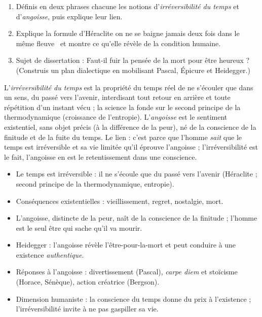 \documentclass[11pt]{article}
\newcommand{\cle}[1]{{\popxbold\color{popdark}#1}}
\begin{document}
\begin{exercice}
\begin{enumerate}
\item Définis en deux phrases chacune les notions d'\emph{irréversibilité du temps} et d'\emph{angoisse}, puis explique leur lien.
\item Explique la formule d'Héraclite \guillemotleft on ne se baigne jamais deux fois dans le même fleuve \guillemotright\ et montre ce qu'elle révèle de la condition humaine.
\item Sujet de dissertation : Faut-il fuir la pensée de la mort pour être heureux ? (Construis un plan dialectique en mobilisant Pascal, Épicure et Heidegger.)
\end{enumerate}
\end{exercice}

\begin{corrige}[Exercice 1]
L'\emph{irréversibilité du temps} est la propriété du temps réel de ne s'écouler que dans un sens, du passé vers l'avenir, interdisant tout retour en arrière et toute répétition d'un instant vécu ; la science la fonde sur le second principe de la thermodynamique (croissance de l'entropie). L'\emph{angoisse} est le sentiment existentiel, sans objet précis (à la différence de la peur), né de la conscience de la finitude et de la fuite du temps. Le lien : c'est parce que l'homme \emph{sait} que le temps est irréversible et sa vie limitée qu'il éprouve l'angoisse ; l'irréversibilité est le fait, l'angoisse en est le retentissement dans une conscience.
\end{corrige}

\begin{aretenir}
\begin{itemize}
\item Le temps est \cle{irréversible} : il ne s'écoule que du passé vers l'avenir (Héraclite ; second principe de la thermodynamique, entropie).
\item Conséquences existentielles : vieillissement, regret, nostalgie, mort.
\item L'\cle{angoisse}, distincte de la peur, naît de la conscience de la finitude ; l'homme est le seul être qui sache qu'il va mourir.
\item Heidegger : l'angoisse révèle l'\cle{être-pour-la-mort} et peut conduire à une existence \emph{authentique}.
\item Réponses à l'angoisse : divertissement (Pascal), \emph{carpe diem} et stoïcisme (Horace, Sénèque), action créatrice (Bergson).
\item Dimension humaniste : la conscience du temps donne du prix à l'existence ; l'irréversibilité invite à ne pas gaspiller sa vie.
\end{itemize}
\end{aretenir}
\end{document}
